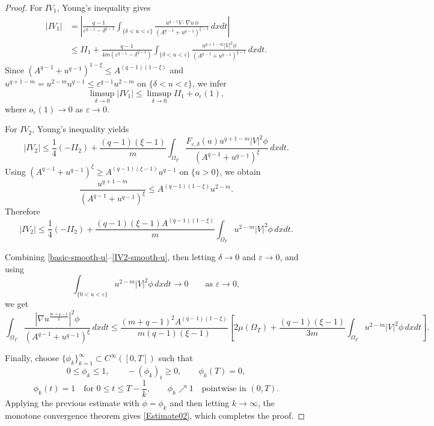 \documentclass{amsart}
\numberwithin{equation}{section}
\begin{document}
\begin{proof}
For $IV_1$, Young's inequality gives
\[
\begin{aligned}
|IV_1|
&=
\left|
\frac{q-1}{\varepsilon^{q-1}-\delta^{q-1}}
\int_{\{\delta<u<\varepsilon\}}
\frac{
u^{q-1}V\cdot\nabla u\,\phi
}
{\left(A^{q-1}+u^{q-1}\right)^{\xi-1}}
\,dxdt
\right| \\
&\le
II_1 +
\frac{q-1}{4m(\varepsilon^{q-1}-\delta^{q-1})}
\int_{\{\delta<u<\varepsilon\}}
\frac{
u^{q+1-m}|V|^2\phi
}
{\left(A^{q-1}+u^{q-1}\right)^{\xi-1}}
\,dxdt.
\end{aligned}
\]
Since
$
\left(A^{q-1}+u^{q-1}\right)^{1-\xi}
\le
A^{(q-1)(1-\xi)}
$
and
$
u^{q+1-m}
=
u^{2-m}u^{q-1}
\le
\varepsilon^{q-1}u^{2-m}
$ 
on $\{\delta<u<\varepsilon\}$,
we infer
\begin{equation}\label{IV1-smooth-u}
\limsup_{\delta\to0}|IV_1|
\le
\limsup_{\delta\to0}II_1
+
o_\varepsilon(1),
\end{equation}
where $o_\varepsilon(1)\to0$ as $\varepsilon\to0$.

For $IV_2$, Young's inequality yields
\[
|IV_2|
\le
\frac14(-II_2)
+
\frac{(q-1)(\xi-1)}{m}
\int_{\Omega_T}
\frac{
F_{\varepsilon,\delta}(u)u^{q+1-m}|V|^2\phi
}
{\left(A^{q-1}+u^{q-1}\right)^\xi}
\,dxdt.
\]
Using
$
\left(A^{q-1}+u^{q-1}\right)^\xi
\ge
A^{(q-1)(\xi-1)}u^{q-1}
$ on $\{u>0\}$,
we obtain
\[
\frac{u^{q+1-m}}
{\left(A^{q-1}+u^{q-1}\right)^\xi}
\le
A^{(q-1)(1-\xi)}u^{2-m}.
\]
Therefore
\begin{equation}\label{IV2-smooth-u}
|IV_2|
\le
\frac14(-II_2)
+
\frac{(q-1)(\xi-1)A^{(q-1)(1-\xi)}}{m}
\int_{\Omega_T}u^{2-m}|V|^2\phi\,dxdt.
\end{equation}

Combining
\eqref{basic-smooth-u}--\eqref{IV2-smooth-u}, then letting
$\delta\to0$ and $\varepsilon\to0$, and using
\[
\int_{\{0<u<\varepsilon\}}
u^{2-m}|V|^2\phi\,dxdt
\to0
\qquad\text{as }\varepsilon\to0,
\]
we get
\[
\int_{\Omega_T}
\frac{
\left|\nabla u^{\frac{m+q-1}{2}}\right|^2\phi
}
{\left(A^{q-1}+u^{q-1}\right)^\xi}
\,dxdt \le
\frac{(m+q-1)^2A^{(q-1)(1-\xi)}}
{m(q-1)(\xi-1)}
\left[
2\mu(\Omega_T)
+
\frac{(q-1)(\xi-1)}{3m}
\int_{\Omega_T}u^{2-m}|V|^2\phi\,dxdt
\right].
\]


Finally, choose $\{\phi_k\}_{k=1}^\infty\subset C^\infty([0,T])$ such that
\[
0\le\phi_k\le1,\qquad -(\phi_k)_t\ge0,\qquad \phi_k(T)=0,
\]
\[
\phi_k(t)=1
\quad\text{for }0\le t\le T-\frac1k,
\qquad
\phi_k\nearrow1
\quad\text{pointwise in }(0,T).
\]
Applying the previous estimate with $\phi=\phi_k$ and then letting
$k\to\infty$, the monotone convergence theorem gives \eqref{Estimate02}, which completes the proof.
\end{proof}
\end{document}
